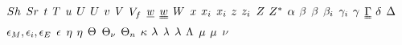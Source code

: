 \begin{mdframed}
$\sherwood$ \newline
$\strouhal$ \newline
$\timet$ \newline
$\Temp$ \newline
$\forcepot$ \newline
$\intenergy$ \newline
$\uvel$ \newline
$\vvel$ \newline
$\vol$ \newline
$\freevol$ \newline
$\vort$ \newline
$\vorttens$ \newline
$\work$ \newline
$\disp$ \newline
$\conjcoor$ \newline
$\specfrac$ \newline
$\height$ \newline
$\charges$ \newline
$\compress$ \newline
$\configint$ \newline
$\tdiff$ \newline
$\boltznorm$ \newline
$\texpcoeff$ \newline
$\sexcoeff$ \newline
$\actcoeff$ \newline
$\surftens$ \newline
$\straintens$ \newline
$\blthick$ \newline
$\iipf$ \newline
$\eddydiff$ \newline
$\dielec$ \newline
$\heateffic$ \newline
$\intrinsvisc$ \newline
$\dimltemp$ \newline
$\vibrfreqfac$ \newline
$\fftcoeff$ \newline
$\comeback$ \newline
$\wavel$ \newline
$\latheat$ \newline
$\debye$ \newline
$\debroglie$ \newline
$\chempot$ \newline
$\visc$ \newline
$\freq$ \newline

\end{mdframed}
